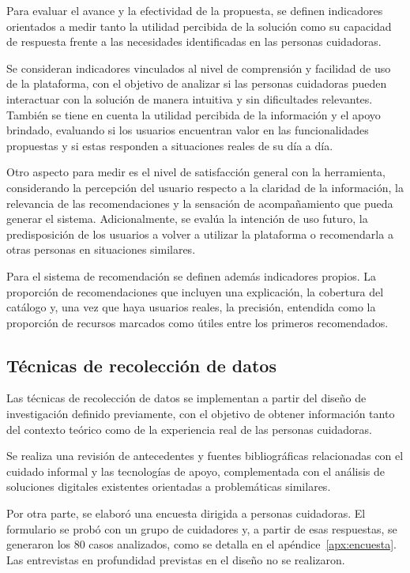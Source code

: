 Para evaluar el avance y la efectividad de la propuesta, se definen indicadores orientados a medir tanto la utilidad percibida de la solución como su capacidad de respuesta frente a las necesidades identificadas en las personas cuidadoras.

Se consideran indicadores vinculados al nivel de comprensión y facilidad de uso de la plataforma, con el objetivo de analizar si las personas cuidadoras pueden interactuar con la solución de manera intuitiva y sin dificultades relevantes. También se tiene en cuenta la utilidad percibida de la información y el apoyo brindado, evaluando si los usuarios encuentran valor en las funcionalidades propuestas y si estas responden a situaciones reales de su día a día.

Otro aspecto para medir es el nivel de satisfacción general con la herramienta, considerando la percepción del usuario respecto a la claridad de la información, la relevancia de las recomendaciones y la sensación de acompañamiento que pueda generar el sistema. Adicionalmente, se evalúa la intención de uso futuro, la predisposición de los usuarios a volver a utilizar la plataforma o recomendarla a otras personas en situaciones similares.

Para el sistema de recomendación se definen además indicadores propios. La proporción de recomendaciones que incluyen una explicación, la cobertura del catálogo y, una vez que haya usuarios reales, la precisión, entendida como la proporción de recursos marcados como útiles entre los primeros recomendados.

\subsection{Técnicas de recolección de datos}

Las técnicas de recolección de datos se implementan a partir del diseño de investigación definido previamente, con el objetivo de obtener información tanto del contexto teórico como de la experiencia real de las personas cuidadoras.

Se realiza una revisión de antecedentes y fuentes bibliográficas relacionadas con el cuidado informal y las tecnologías de apoyo, complementada con el análisis de soluciones digitales existentes orientadas a problemáticas similares.

Por otra parte, se elaboró una encuesta dirigida a personas cuidadoras. El formulario se probó con un grupo de cuidadores y, a partir de esas respuestas, se generaron los 80 casos analizados, como se detalla en el apéndice~\ref{apx:encuesta}. Las entrevistas en profundidad previstas en el diseño no se realizaron.

